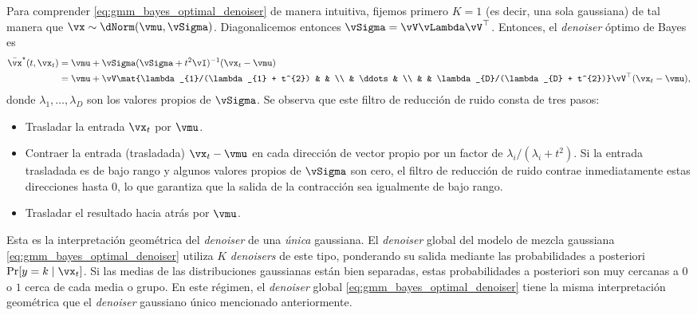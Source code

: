 \documentclass[../../book-main.tex]{subfiles}
\begin{document}
\begin{example}
    Para comprender \eqref{eq:gmm_bayes_optimal_denoiser}
    de manera intuitiva, fijemos primero \(K = 1\) (es decir, una sola gaussiana) de tal
    manera que \(\vx \sim \dNorm(\vmu, \vSigma)\). Diagonalicemos entonces
    \(\vSigma = \vV\vLambda \vV^{\top}\). Entonces, el \textit{denoiser} óptimo de Bayes es
    \begin{align}
        \bar{\vx}^{\star}(t, \vx_{t}) & = \vmu + \vSigma(\vSigma +
        t^{2}\vI)^{-1}(\vx_{t} - \vmu) \\
        & = \vmu + \vV\mat{\lambda_{1}/(\lambda_{1} + t^{2}) & & \\ &
            \ddots & \\ & & \lambda_{D}/(\lambda_{D} +
        t^{2})}\vV^{\top}(\vx_{t} - \vmu),\label{eq:gaussian_denoiser}
    \end{align}
    donde \(\lambda_{1}, \dots, \lambda_{D}\) son los valores propios de
    \(\vSigma\). Se observa que este filtro de reducción de ruido consta de tres pasos:
    \begin{itemize}
        \item Trasladar la entrada \(\vx_{t}\) por \(\vmu\). 
        \item Contraer la entrada (trasladada) \(\vx_{t} - \vmu\) en
            cada dirección de vector propio por un factor de
            \(\lambda_{i}/(\lambda_{i} + t^{2})\). Si la entrada trasladada
            es de bajo rango y algunos valores propios de \(\vSigma\) son
            cero, el filtro de reducción de ruido contrae inmediatamente estas direcciones hasta
            \(0\), lo que garantiza que la salida de la
            contracción sea igualmente de bajo rango.
        \item Trasladar el resultado hacia atrás por \(\vmu\). 
    \end{itemize}
    Esta es la interpretación geométrica del \textit{denoiser} de una
    \textit{única} gaussiana. El \textit{denoiser} global del modelo de mezcla gaussiana
    \eqref{eq:gmm_bayes_optimal_denoiser} utiliza \(K\)
    \textit{denoisers} de este tipo, ponderando su salida mediante las probabilidades a posteriori
    \(\Pr[y = k \mid \vx_{t}]\). Si las medias de las
    distribuciones gaussianas están bien separadas, estas probabilidades a posteriori son
    muy cercanas a \(0\) o \(1\) cerca de cada media o grupo. En este
    régimen, el \textit{denoiser} global
    \eqref{eq:gmm_bayes_optimal_denoiser} tiene la misma interpretación geométrica
    que el \textit{denoiser} gaussiano único mencionado anteriormente.
\end{example}
\end{document}

